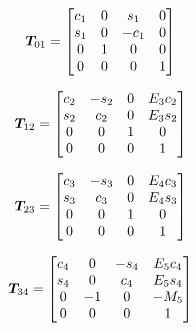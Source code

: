 



\[ \bm{T}_{01} = 
\begin{bmatrix}c_1 & 0 & s_1 &  0 \\
   s_1 & 0 & -c_1 & 0 \\
   0   & 1 &    0 & 0 \\
   0   & 0 &    0 & 1\end{bmatrix}\]

\[ \bm{T}_{12} = 
\begin{bmatrix}c_2 & -s_2 &  0 & E_3 c_2 \\
   s_2 &  c_2 &  0 & E_3 s_2  \\
   0   &    0 &  1 & 	   0  \\
   0   &    0 &  0 &       1\end{bmatrix} \]

\[ \bm{T}_{23} = 
\begin{bmatrix}c_3 & -s_3 &  0 & E_4 c_3 \\
   s_3 &  c_3 &  0 & E_4 s_3  \\
   0   &    0 &  1 & 	   0  \\
   0   &    0 &  0 &       1\end{bmatrix} \]

\[ \bm{T}_{34} = 
\begin{bmatrix}c_4 &    0 &  -s_4 & E_5 c_4 \\
   s_4 &    0 &   c_4 & E_5 s_4 \\
   0   &   -1 &     0 & 	-M_5 \\
   0   &    0 &     0 &       1\end{bmatrix} \]


